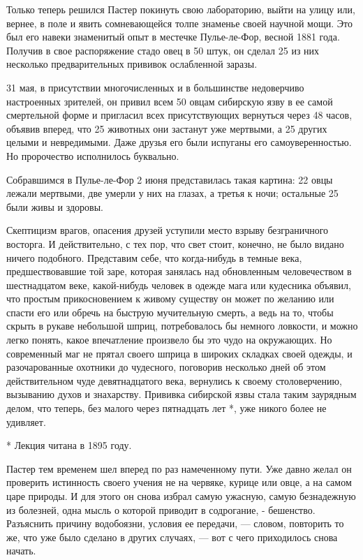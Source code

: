 Только теперь решился Пастер покинуть свою лабораторию, выйти на улицу
или, вернее, в поле и явить сомневающейся толпе знаменье своей научной
мощи.  Это был  его навеки  знаменитый опыт  в местечке  Пулье-ле-Фор,
весной 1881 года. Получив в свое распоряжение стадо овец в 50 штук, он
сделал  25  из  них  несколько  предварительных  прививок  ослабленной
заразы.

31  мая,  в присутствии  многочисленных  и  в большинстве  недоверчиво
настроенных  зрителей, он  привил всем  50 овцам  сибирскую язву  в ее
самой  смертельной форме  и  пригласил  всех присутствующих  вернуться
через  48 часов,  объявив вперед,  что  25 животных  они застанут  уже
мертвыми,  а 25  других целыми  и  невредимыми. Даже  друзья его  были
испуганы его самоуверенностью. Но пророчество исполнилось буквально.

Собравшимся в Пулье-ле-Фор 2 июня представилась такая картина: 22 овцы
лежали  мертвыми,  две умерли  у  них  на  глазах,  а третья  к  ночи;
остальные 25 были живы и здоровы.

Скептицизм врагов, опасения друзей уступили место взрыву безграничного
восторга. И действительно, с тех пор, что свет стоит, конечно, не было
видано ничего  подобного. Представим  себе, что когда-нибудь  в темные
века,  предшествовавшие той  заре,  которая  занялась над  обновленным
человечеством в шестнадцатом веке,  какой-нибудь человек в одежде мага
или кудесника объявил, что простым прикосновением к живому существу он
может  по желанию  или спасти  его или  обречь на  быструю мучительную
смерть,  а  ведь  на  то,  чтобы  скрыть  в  рукаве  небольшой  шприц,
потребовалось  бы  немного  ловкости,  и  можно  легко  понять,  какое
впечатление произвело бы это чудо на окружающих. Но современный маг не
прятал своего шприца в широких складках своей одежды, и разочарованные
охотники до чудесного, поговорив несколько дней об этом действительном
чуде девятнадцатого века, вернулись  к своему столоверчению, вызыванию
духов  и знахарству.  Прививка  сибирской язвы  стала таким  заурядным
делом, что теперь, без малого через пятнадцать лет *, уже никого более
не удивляет.

* Лекция читана в 1895 году.

Пастер  тем временем  шел вперед  по раз  намеченному пути.  Уже давно
желал он проверить истинность своего  учения не на червяке, курице или
овце,  а на  самом царе  природы. И  для этого  он снова  избрал самую
ужасную, самую безнадежную из болезней,  одна мысль о которой приводит
в содрогание,  - бешенство. Разъяснить причину  водобоязни, условия ее
передачи, --- словом,  повторить то же, что уже было  сделано в других
случаях, --- вот с чего приходилось снова начать.

